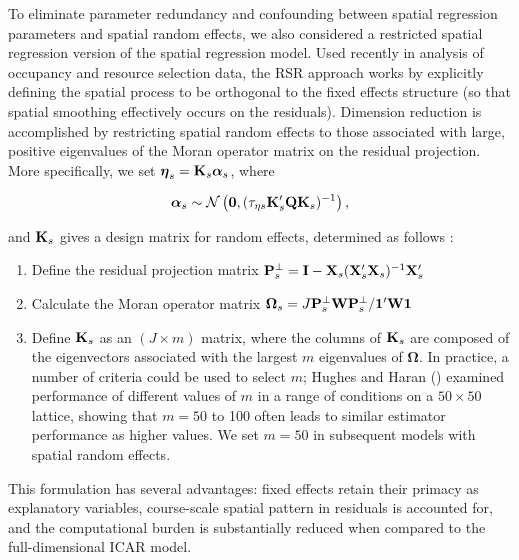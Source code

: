 \documentclass[12pt,fleqn]{article}
\begin{document}
\begin{flushleft}
\hspace{.5in}To eliminate parameter redundancy and confounding between spatial regression parameters and spatial random effects, we also considered a restricted spatial regression \citep[RSR;][]{ReichEtAl2006,HodgesReich2010,HughesHaran2013} version of the spatial regression model.  Used recently in analysis of occupancy \citep{JohnsonEtAl2013} and resource selection \citep{HootenEtAl2013} data, the RSR approach works by explicitly defining the spatial process to be orthogonal to the fixed effects structure (so that spatial smoothing effectively occurs on the residuals).  Dimension reduction is accomplished by restricting spatial random effects to those associated with large, positive eigenvalues of the Moran operator matrix on the residual projection.  More specifically, we set
$\boldsymbol{\eta}_s = {\bf K}_s\boldsymbol{\alpha}_s$, where
\begin{linenomath*}
\begin{equation*}
 \boldsymbol{\alpha}_s \sim \mathcal{N} \left( {\bf 0},(\tau_{\eta s}{\bf K}_s^\prime{\bf Q} {\bf K}_s)^{-1} \right),
\end{equation*}
\end{linenomath*}
and ${\bf K}_s$ gives a design matrix for random effects, determined
as follows \citep{JohnsonEtAl2013}:
\begin{enumerate}
  \item Define the residual projection matrix ${\bf P}_s^\perp={\bf I}-{\bf X}_s({\bf X}_s^\prime{\bf X}_s)^{-1}{\bf X}_s^\prime$
  \item Calculate the Moran operator matrix $\boldsymbol{\Omega}_s=J{\bf P}_s^\perp {\bf W}{\bf P}_s^\perp/{\bf 1}^\prime {\bf W} {\bf 1}$
  \item Define ${\bf K}_s$ as an $(J \times m)$ matrix, where the columns of ${\bf K}_s$ are composed of the eigenvectors  associated with the largest $m$ eigenvalues of $\boldsymbol{\Omega}$.  In practice, a number of criteria could be used to select $m$; Hughes and Haran (\citeyear{HughesHaran2013}) examined performance of different values of $m$ in a range of conditions on a $50 \times 50$ lattice, showing that $m=50$ to 100 often leads to similar estimator performance as higher values. We set $m=50$ in subsequent models with spatial random effects.
\end{enumerate}
This formulation has several advantages: fixed effects retain their primacy as explanatory variables, course-scale spatial pattern in residuals is accounted for, and the computational burden is substantially
reduced when compared to the full-dimensional ICAR model.


\end{flushleft}
\end{document}
